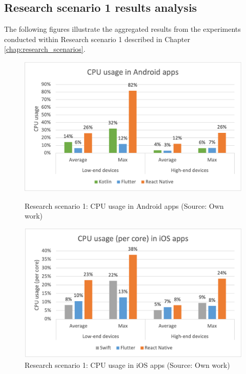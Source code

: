 
\subsection{Research scenario 1 results analysis}

The following figures illustrate the aggregated results from the experiments conducted within Research scenario 1 described in Chapter \ref{chap:research_scenarios}.

\begin{figure}[H]
    \begin{minipage}{.48\textwidth}
        \includegraphics[width=\textwidth]{img/scenario1_cpu_android}
        \caption{Research scenario 1: CPU usage in Android apps (Source: Own work)}
        \label{fig:s1_cpu_android}
    \end{minipage}
    \hfill
    \begin{minipage}{.48\textwidth}
        \includegraphics[width=\textwidth]{img/scenario1_cpu_ios}
        \caption{Research scenario 1: CPU usage in iOS apps (Source: Own work)}
        \label{fig:s1_cpu_ios}
    \end{minipage}
\end{figure}

